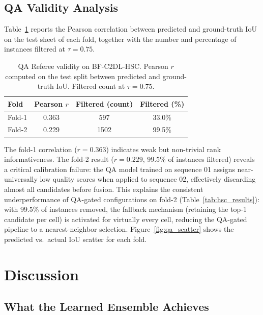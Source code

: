 \subsection{QA Validity Analysis}
\label{sec:qa_analysis}

Table~\ref{tab:qa_validity} reports the Pearson correlation between predicted and ground-truth IoU
on the test sheet of each fold, together with the number and percentage of instances filtered at
$\tau = 0.75$.

\begin{table}[ht]
\centering
\caption{QA Referee validity on BF-C2DL-HSC. Pearson $r$ computed on the test split between predicted and ground-truth IoU. Filtered count at $\tau = 0.75$.}
\label{tab:qa_validity}
\begin{tabular}{lccc}
\hline
\textbf{Fold} & \textbf{Pearson $r$} & \textbf{Filtered (count)} & \textbf{Filtered (\%)} \\
\hline
Fold-1 & 0.363 & 597  & 33.0\% \\
Fold-2 & 0.229 & 1502 & 99.5\% \\
\hline
\end{tabular}
\end{table}

The fold-1 correlation ($r = 0.363$) indicates weak but non-trivial rank informativeness. The
fold-2 result ($r = 0.229$, 99.5\% of instances filtered) reveals a critical calibration failure:
the QA model trained on sequence 01 assigns near-universally low quality scores when applied to
sequence 02, effectively discarding almost all candidates before fusion. This explains the
consistent underperformance of QA-gated configurations on fold-2 (Table~\ref{tab:hsc_results}):
with 99.5\% of instances removed, the fallback mechanism (retaining the top-1 candidate per cell)
is activated for virtually every cell, reducing the QA-gated pipeline to a nearest-neighbor
selection. Figure~\ref{fig:qa_scatter} shows the predicted vs.\ actual IoU scatter for each fold.


\section{Discussion} %
\label{sec:discussion}

\subsection{What the Learned Ensemble Achieves}

